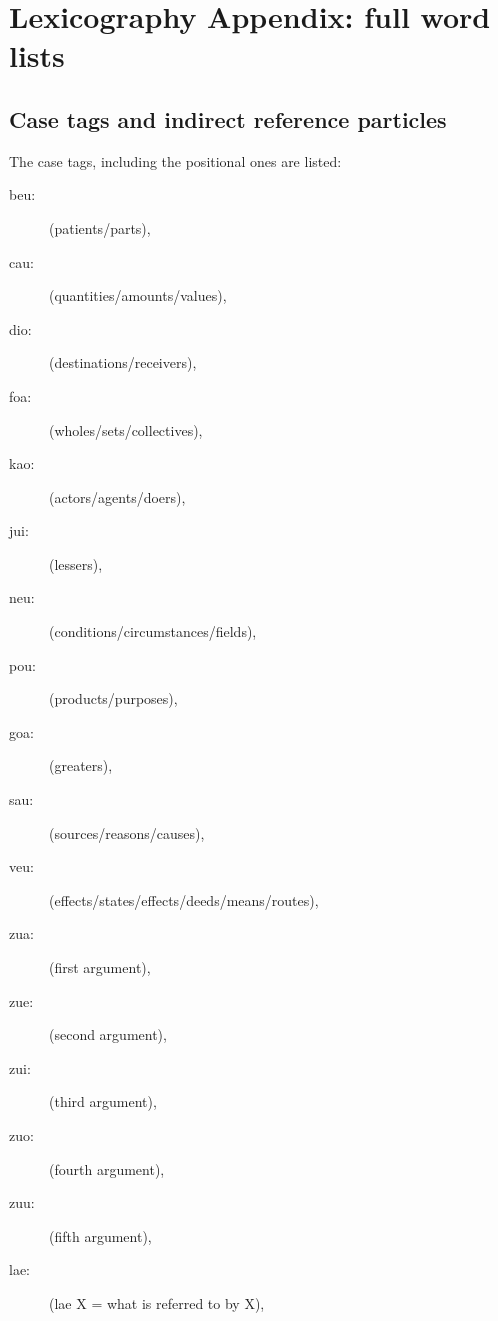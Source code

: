\documentclass[12pt]{book}
\begin{document}
{\chapter{Lexicography Appendix:  full word lists}

\section{Case tags and indirect reference particles}

The case tags, including the positional ones are listed:  

\begin{description}

\item[beu:] (patients/parts), 

\item[cau:] (quantities/amounts/values), 

\item[dio:] (destinations/receivers), 

\item[foa:] (wholes/sets/collectives), 

\item[kao:] (actors/agents/doers), 

\item[jui:] (lessers),

\item[neu:] (conditions/circumstances/fields), 

\item[pou:] (products/purposes), 

\item[goa:] (greaters), 

\item[sau:] (sources/reasons/causes), 

\item[veu:] (effects/states/effects/deeds/means/routes), 

\item[zua:] (first argument), 

\item[zue:] (second argument), 

\item[zui:] (third argument), 

\item[zuo:] (fourth argument), 

\item[zuu:] (fifth argument), 

\item[lae:] (lae X = what is referred to by X), 


\end{description}}
\end{document}
